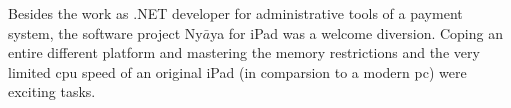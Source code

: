 



Besides the work as .NET developer for administrative tools of a payment system, 
the software project Ny$\bar{a}$ya for iPad was a welcome diversion.
Coping an entire different platform and mastering 
the memory restrictions and the very limited cpu speed of an original iPad 
(in comparsion to a modern pc) were exciting tasks. 


